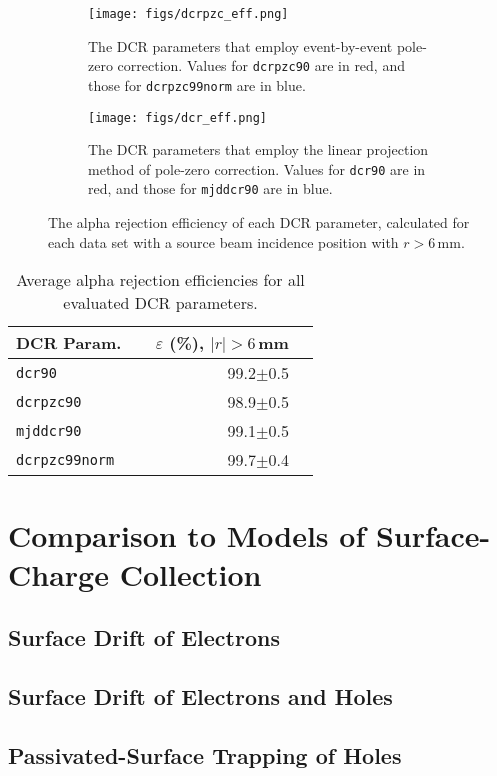 \documentclass[groupedaddress,rmp,amsmath,amssymb,bibnotes,altaffilletter,twocolumn]{revtex4-1}
\begin{document}
\begin{figure*}[]
 \centering
 \begin{subfigure}{.45\textwidth}
 \texttt{[image: figs/dcrpzc\_eff.png]}
 \caption{The DCR parameters that employ event-by-event pole-zero correction. Values for {\tt dcrpzc90} are in red, and those for {\tt dcrpzc99norm} are in blue.} 
 \end{subfigure}
  \begin{subfigure}{.45\textwidth}
 \texttt{[image: figs/dcr\_eff.png]}
 \caption{The DCR parameters that employ the linear projection method of pole-zero correction. Values for {\tt dcr90} are in red, and those for {\tt mjddcr90} are in blue.} 
 \end{subfigure}
 \caption{The alpha rejection efficiency of each DCR parameter, calculated for each data set with a source beam incidence position with $r>6$\,mm.}
 \label{fig:eff_allR}
\end{figure*}

\begin{table}[]
\begin{center}
\begin{tabular}{l r r}
DCR Param. & ~~$\varepsilon$ (\%), $|r|>6$\,mm \\  \hline
{\tt dcr90} & 99.2$\pm$0.5  \\
{\tt dcrpzc90} & 98.9$\pm$0.5  \\
{\tt mjddcr90} & 99.1$\pm$0.5  \\
{\tt dcrpzc99norm} &  99.7$\pm$0.4 \\
\end{tabular}
\caption{Average alpha rejection efficiencies for all evaluated DCR parameters.} \label{tab:avgEff}
\end{center}
\end{table}


\section{Comparison to Models of Surface-Charge Collection}
\subsection{Surface Drift of Electrons}
\subsection{Surface Drift of Electrons and Holes}
\subsection{Passivated-Surface Trapping of Holes}
\end{document}

